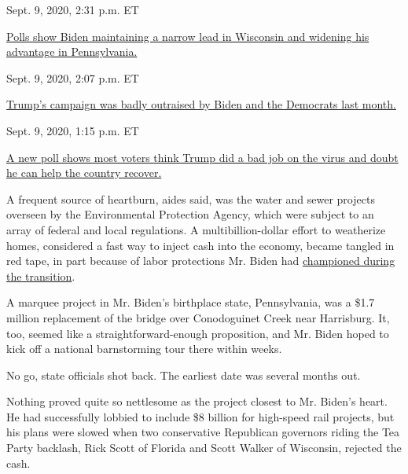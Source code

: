 Sept. 9, 2020, 2:31 p.m. ET

\href{https://www.nytimes3xbfgragh.onion/live/2020/09/09/us/trump-vs-biden\#polls-show-biden-maintaining-a-narrow-lead-in-wisconsin-and-widening-his-advantage-in-pennsylvania}{Polls
show Biden maintaining a narrow lead in Wisconsin and widening his
advantage in
Pennsylvania.}\href{https://www.nytimes3xbfgragh.onion/live/2020/09/09/us/trump-vs-biden\#trumps-campaign-was-badly-outraised-by-biden-and-the-democrats-last-month}{}

Sept. 9, 2020, 2:07 p.m. ET

\href{https://www.nytimes3xbfgragh.onion/live/2020/09/09/us/trump-vs-biden\#trumps-campaign-was-badly-outraised-by-biden-and-the-democrats-last-month}{Trump's
campaign was badly outraised by Biden and the Democrats last
month.}\href{https://www.nytimes3xbfgragh.onion/live/2020/09/09/us/trump-vs-biden\#a-new-poll-shows-most-voters-think-trump-did-a-bad-job-on-the-virus-and-doubt-he-can-help-the-country-recover}{}

Sept. 9, 2020, 1:15 p.m. ET

\href{https://www.nytimes3xbfgragh.onion/live/2020/09/09/us/trump-vs-biden\#a-new-poll-shows-most-voters-think-trump-did-a-bad-job-on-the-virus-and-doubt-he-can-help-the-country-recover}{A
new poll shows most voters think Trump did a bad job on the virus and
doubt he can help the country recover.}

A frequent source of heartburn, aides said, was the water and sewer
projects overseen by the Environmental Protection Agency, which were
subject to an array of federal and local regulations. A
multibillion-dollar effort to weatherize homes, considered a fast way to
inject cash into the economy, became tangled in red tape, in part
because of labor protections Mr. Biden had
\href{https://abcnews.go.com/WN/Politics/stimulus-weatherization-jobs-president-obama-congress-recovery-act/story?id=9780935}{championed
during the transition}.

A marquee project in Mr. Biden's birthplace state, Pennsylvania, was a
\$1.7 million replacement of the bridge over Conodoguinet Creek near
Harrisburg. It, too, seemed like a straightforward-enough proposition,
and Mr. Biden hoped to kick off a national barnstorming tour there
within weeks.

No go, state officials shot back. The earliest date was several months
out.

Nothing proved quite so nettlesome as the project closest to Mr. Biden's
heart. He had successfully lobbied to include \$8 billion for high-speed
rail projects, but his plans were slowed when two conservative
Republican governors riding the Tea Party backlash, Rick Scott of
Florida and Scott Walker of Wisconsin, rejected the cash.

